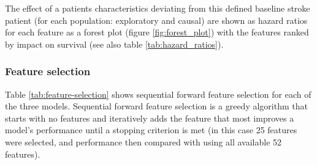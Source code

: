 The effect of a patients characteristics deviating from this defined baseline stroke patient (for each population: exploratory and causal) are shown as hazard ratios for each feature as a forest plot (figure \ref{fig:forest_plot}) with the features ranked by impact on survival (see also table \ref{tab:hazard_ratios}).


\subsubsection{Feature selection}

Table \ref{tab:feature-selection} shows sequential forward feature selection for each of the three models. Sequential forward feature selection is a greedy algorithm that starts with no features and iteratively adds the feature that most improves a model’s performance until a stopping criterion is met (in this case 25 features were selected, and performance then compared with using all available 52 features).

